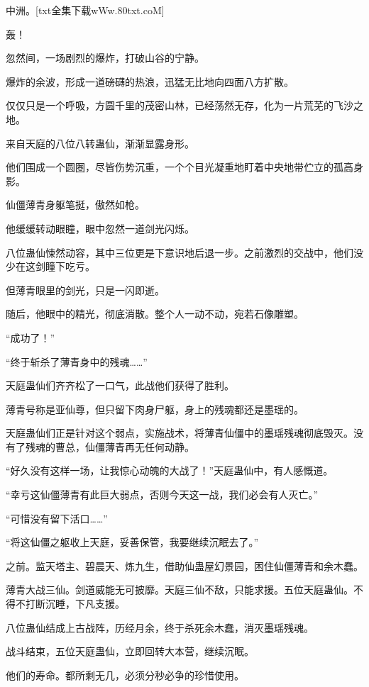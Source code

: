 
\begin{this_body}

中洲。[txt全集下载wWw.80txt.coM]

轰！

忽然间，一场剧烈的爆炸，打破山谷的宁静。

爆炸的余波，形成一道磅礴的热浪，迅猛无比地向四面八方扩散。

仅仅只是一个呼吸，方圆千里的茂密山林，已经荡然无存，化为一片荒芜的飞沙之地。

来自天庭的八位八转蛊仙，渐渐显露身形。

他们围成一个圆圈，尽皆伤势沉重，一个个目光凝重地盯着中央地带伫立的孤高身影。

仙僵薄青身躯笔挺，傲然如枪。

他缓缓转动眼瞳，眼中忽然一道剑光闪烁。

八位蛊仙悚然动容，其中三位更是下意识地后退一步。之前激烈的交战中，他们没少在这剑瞳下吃亏。

但薄青眼里的剑光，只是一闪即逝。

随后，他眼中的精光，彻底消散。整个人一动不动，宛若石像雕塑。

“成功了！”

“终于斩杀了薄青身中的残魂……”

天庭蛊仙们齐齐松了一口气，此战他们获得了胜利。

薄青号称是亚仙尊，但只留下肉身尸躯，身上的残魂都还是墨瑶的。

天庭蛊仙们正是针对这个弱点，实施战术，将薄青仙僵中的墨瑶残魂彻底毁灭。没有了残魂的曹总，仙僵薄青再无任何动静。

“好久没有这样一场，让我惊心动魄的大战了！”天庭蛊仙中，有人感慨道。

“幸亏这仙僵薄青有此巨大弱点，否则今天这一战，我们必会有人灭亡。”

“可惜没有留下活口……”

“将这仙僵之躯收上天庭，妥善保管，我要继续沉眠去了。”

之前。监天塔主、碧晨天、炼九生，借助仙蛊屋幻景园，困住仙僵薄青和余木蠢。

薄青大战三仙。剑道威能无可披靡。天庭三仙不敌，只能求援。五位天庭蛊仙。不得不打断沉睡，下凡支援。

八位蛊仙结成上古战阵，历经月余，终于杀死余木蠢，消灭墨瑶残魂。

战斗结束，五位天庭蛊仙，立即回转大本营，继续沉眠。

他们的寿命。都所剩无几，必须分秒必争的珍惜使用。


\end{this_body}
